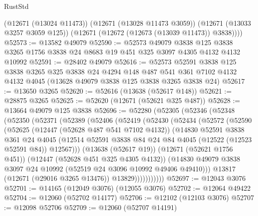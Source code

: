 \begin{lexlean}{RustStd}
\begin{coremodule}
        (@12671 (@13024 @11473))
        (@12671 (@13028 @11473 @3059))
        (@12671 (@13033 @3257 @3059 @125))
        (@12671 (@12672 (@12673 (@13039 @11473)) @3838))))
@52573 := @13582 @49079
@52590 := @52573
    @49079
    @3838
    @125
    @3838
    @3265
    @1756
    @3838
    @24
    @8683
    @19
    @451
    @325
    @3097
    @4305
    @4132
    @4132
    @10992
@52591 := @28402 @49079
@52616 := @52573
    @52591
    @3838
    @125
    @3838
    @3265
    @325
    @3838
    @24
    @4294
    @148
    @487
    @541
    @361
    @7102
    @4132
    @4132
    @4045
    (@13628 @49079 @3838 @125 @3838 @3265 @3838 @24)
@52617 := @13650 @3265
@52620 := @52616 (@13638 (@52617 @148))
@52621 := @28875 @3265
@52625 := @52620 (@12671 (@52621 @325 @487))
@52628 := @13664 @49079 @125 @3838
@52696 := @52280
    (@52305
      (@52346
        (@52348
          (@52350
            (@52371
              (@52389
                (@52406
                  (@52419
                    (@52430
                      (@52434
                        (@52572
                          (@52590
                            (@52625
                              (@12447 (@52628 @487 @541 @7102 @4132))
                              (@14830
                                @52591
                                @3838
                                @361
                                @24
                                @4045
                                (@12514
                                  @52591
                                  @3838
                                  @84
                                  @24
                                  @84
                                  @4045
                                  (@12522 (@12523 @52591 @84))
                                  @12567)))
                            (@13638 (@52617 @19))
                            (@12671 (@52621 @1756 @451))
                            (@12447 (@52628 @451 @325 @4305 @4132))
                            (@14830
                              @49079
                              @3838
                              @3097
                              @24
                              @10992
                              (@52519 @24 @3096 @10992 @49406 @49410)))
                          @13817
                          (@12671 (@29016 @3265 @13476))
                          @13829)))))))))))
@52697 := @12043 @3076
@52701 := @14165 (@12049 @3076) (@12055 @3076)
@52702 := @12064 @49422
@52704 := @12060 (@52702 @14177)
@52706 := @12102 (@12103 @3076)
@52707 := @12098 @52706
@52709 := @12060 (@52707 @14191)

\end{coremodule}
\end{lexlean}
